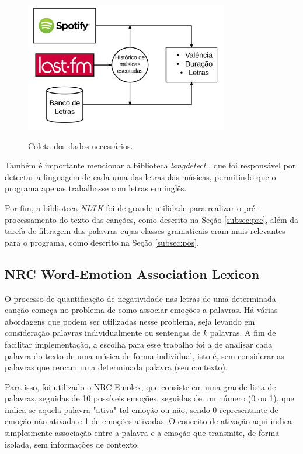 \begin{figure}
\includegraphics[height=2.5in, width=3.5in]{data.png}
\caption{Coleta dos dados necessários.}
\label{fig:data}
\end{figure}

Também é importante mencionar a biblioteca \textit{langdetect}
\cite{langdetect}, que foi responsável por detectar a linguagem de cada uma
das letras das músicas, permitindo que o programa apenas trabalhasse com
letras em inglês.

Por fim, a biblioteca \textit{NLTK} \cite{Perkins:1953497} foi de grande utilidade para realizar o pré-processamento do texto das canções, como
descrito na Seção \ref{subsec:pre}, além da tarefa de filtragem das
palavras cujas classes gramaticais eram mais relevantes para o programa,
como descrito na Seção \ref{subsec:pos}.

\subsection{NRC Word-Emotion Association Lexicon} \label{subsec:nrc}

O processo de quantificação de negatividade nas letras de uma determinada
canção começa no problema de como associar emoções a palavras. Há várias
abordagens que podem ser utilizadas nesse problema, seja levando em 
consideração palavras individualmente ou sentenças de $ k $ palavras. 
A fim de facilitar implementação, a escolha para esse trabalho foi a de
analisar cada palavra do texto de uma música de forma individual, isto é,
sem considerar as palavras que cercam uma determinada palavra (seu contexto).

Para isso, foi utilizado o NRC Emolex, que consiste em uma grande lista de
palavras, seguidas de 10 possíveis emoções, seguidas de um número (0 ou 1),
que indica se aquela palavra "ativa" tal emoção ou não, sendo 0 representante
de emoção não ativada e 1 de emoções ativadas. O conceito de ativação aqui
indica simplesmente associação entre a palavra e a emoção que transmite, de 
forma isolada, sem informações de contexto.

